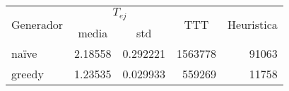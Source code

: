 \begin{tabular}{lrrrr}
\toprule
\multicolumn{1}{c}{\multirow{2}{*}{Generador}} &
\multicolumn{2}{c}{$T_{ej}$} &
\multicolumn{1}{c}{\multirow{2}{*}{TTT}} &
\multicolumn{1}{c}{\multirow{2}{*}{Heuristica}}
\\
{} & \multicolumn{1}{c}{media} &       \multicolumn{1}{c}{std} &  \\
\midrule
naïve    &  2.18558 &  0.292221 &                       1563778  &  91063 \\
greedy   &  1.23535 &  0.029933 &                       559269  &  11758 \\
\bottomrule
\end{tabular}
